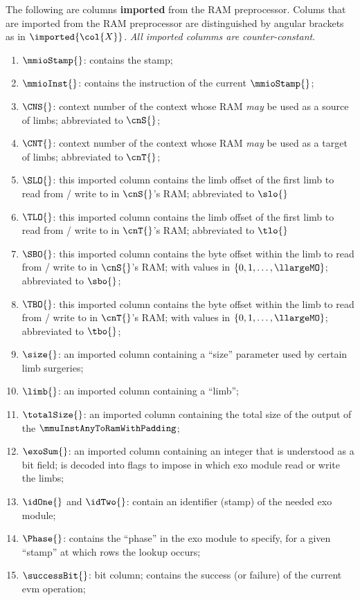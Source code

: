The following are columns \textbf{imported} from the RAM preprocessor. Colums that are imported from the RAM preprocessor are distinguished by angular brackets as in $\imported{\col{X}}$. \emph{All imported columms are counter-constant}.
\begin{enumerate}[resume]
	\item $\mmioStamp{}$: contains the \mmioMod{} stamp;
	\item $\mmioInst{}$: contains the \mmioMod{} instruction of the current $\mmioStamp{}$;
	\item $\CNS{}$: context number of the context whose RAM \emph{may} be used as a source of limbs; abbreviated to $\cnS{}$;
	\item $\CNT{}$: context number of the context whose RAM \emph{may} be used as a target of limbs; abbreviated to $\cnT{}$;
	\item $\SLO{}$: this imported column contains the limb offset of the first limb to read from / write to in $\cnS{}$'s RAM; abbreviated to $\slo{}$
	\item $\TLO{}$: this imported column contains the limb offset of the first limb to read from / write to in $\cnT{}$'s RAM; abbreviated to $\tlo{}$
	\item $\SBO{}$: this imported column contains the byte offset within the limb to read from / write to in $\cnS{}$'s RAM; with values in $\{0,1,\dots, \llargeMO\}$; abbreviated to $\sbo{}$;
	\item $\TBO{}$: this imported column contains the byte offset within the limb to read from / write to in $\cnT{}$'s RAM; with values in $\{0,1,\dots, \llargeMO\}$; abbreviated to $\tbo{}$;
	\item $\size{}$: an imported column containing a ``size'' parameter used by certain limb surgeries;
	\item $\limb{}$: an imported column containing a ``limb'';
	\item $\totalSize{}$: an imported column containing the total size of the output of the $\mmuInstAnyToRamWithPadding$;
	\item $\exoSum{}$: an imported column containing an integer that is understood as a bit field; is decoded into flags to impose in which exo module read or write the limbs;
	\item $\idOne{}$ and $\idTwo{}$: contain an identifier (stamp) of the needed exo module;
	\item $\Phase{}$: contains the ``phase'' in the exo module to specify, for a given ``stamp'' at which rows the lookup occurs;
	\item $\successBit{}$: bit column; contains the success (or failure) of the current evm operation;
\end{enumerate}

